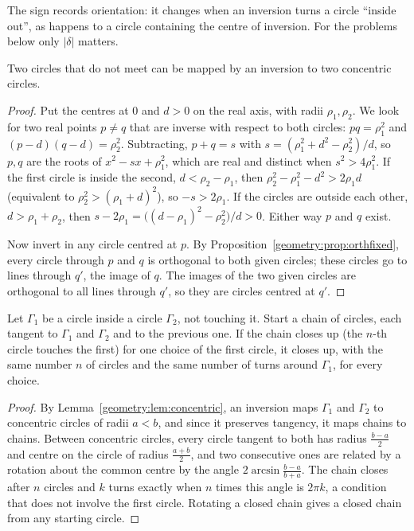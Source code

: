 The sign records orientation: it changes when an inversion turns a circle ``inside out'', as happens to a circle containing the centre of
inversion. For the problems below only $|\delta|$ matters.

\begin{lemma}\label{geometry:lem:concentric}
Two circles that do not meet can be mapped by an inversion to two concentric circles.
\end{lemma}
\begin{proof}
Put the centres at $0$ and $d>0$ on the real axis, with radii $\rho_1,\rho_2$. We look for two real points $p\ne q$ that are inverse with respect
to both circles: $pq=\rho_1^2$ and $(p-d)(q-d)=\rho_2^2$. Subtracting, $p+q=s$ with $s=(\rho_1^2+d^2-\rho_2^2)/d$, so $p,q$ are the roots of
$x^2-sx+\rho_1^2$, which are real and distinct when $s^2>4\rho_1^2$. If the first circle is inside the second, $d<\rho_2-\rho_1$, then
$\rho_2^2-\rho_1^2-d^2>2\rho_1d$ (equivalent to $\rho_2^2>(\rho_1+d)^2$), so $-s>2\rho_1$. If the circles are outside each other,
$d>\rho_1+\rho_2$, then $s-2\rho_1=\bigl((d-\rho_1)^2-\rho_2^2\bigr)/d>0$. Either way $p$ and $q$ exist.

Now invert in any circle centred at $p$. By Proposition~\ref{geometry:prop:orthfixed}, every circle through $p$ and $q$ is orthogonal to both given
circles; these circles go to lines through $q'$, the image of $q$. The images of the two given circles are orthogonal to all lines through
$q'$, so they are circles centred at $q'$.
\end{proof}

\begin{theorem}\label{geometry:thm:steiner}
Let $\Gamma_1$ be a circle inside a circle $\Gamma_2$, not touching it. Start a chain of circles, each tangent to $\Gamma_1$ and $\Gamma_2$ and to the
previous one. If the chain closes up (the $n$-th circle touches the first) for one choice of the first circle, it closes up, with the same
number $n$ of circles and the same number of turns around $\Gamma_1$, for every choice.
\end{theorem}
\begin{proof}
By Lemma~\ref{geometry:lem:concentric}, an inversion maps $\Gamma_1$ and $\Gamma_2$ to concentric circles of radii $a<b$, and since it preserves tangency, it
maps chains to chains. Between concentric circles, every circle tangent to both has radius $\frac{b-a}2$ and centre on the circle of radius
$\frac{a+b}2$, and two consecutive ones are related by a rotation about the common centre by the angle $2\arcsin\frac{b-a}{b+a}$. The chain
closes after $n$ circles and $k$ turns exactly when $n$ times this angle is $2\pi k$, a condition that does not involve the first circle. Rotating
a closed chain gives a closed chain from any starting circle.
\end{proof}

